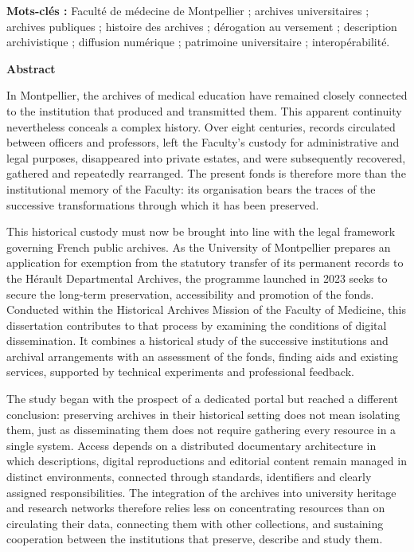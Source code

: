 \vspace{0.6cm}

\noindent\textbf{Mots-clés :} Faculté de médecine de Montpellier ; archives universitaires ; archives publiques ; histoire des archives ; dérogation au versement ; description archivistique ; diffusion numérique ; patrimoine universitaire ; interopérabilité.

\vspace{1cm}

\noindent\textbf{Abstract}

In Montpellier, the archives of medical education have remained closely connected to the institution that produced and transmitted them. This apparent continuity nevertheless conceals a complex history. Over eight centuries, records circulated between officers and professors, left the Faculty's custody for administrative and legal purposes, disappeared into private estates, and were subsequently recovered, gathered and repeatedly rearranged. The present fonds is therefore more than the institutional memory of the Faculty: its organisation bears the traces of the successive transformations through which it has been preserved.

This historical custody must now be brought into line with the legal framework governing French public archives. As the University of Montpellier prepares an application for exemption from the statutory transfer of its permanent records to the Hérault Departmental Archives, the programme launched in 2023 seeks to secure the long-term preservation, accessibility and promotion of the fonds. Conducted within the Historical Archives Mission of the Faculty of Medicine, this dissertation contributes to that process by examining the conditions of digital dissemination. It combines a historical study of the successive institutions and archival arrangements with an assessment of the fonds, finding aids and existing services, supported by technical experiments and professional feedback.

The study began with the prospect of a dedicated portal but reached a different conclusion: preserving archives in their historical setting does not mean isolating them, just as disseminating them does not require gathering every resource in a single system. Access depends on a distributed documentary architecture in which descriptions, digital reproductions and editorial content remain managed in distinct environments, connected through standards, identifiers and clearly assigned responsibilities. The integration of the archives into university heritage and research networks therefore relies less on concentrating resources than on circulating their data, connecting them with other collections, and sustaining cooperation between the institutions that preserve, describe and study them.

